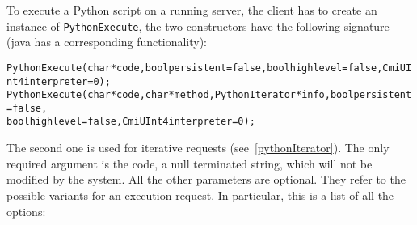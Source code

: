 To execute a Python script on a running server, the client has to create an
instance of \texttt{PythonExecute}, the two constructors have the following
signature (java has a corresponding functionality):

\begin{alltt}
PythonExecute(char *code, bool persistent=false, bool highlevel=false, CmiUInt4 interpreter=0);
PythonExecute(char *code, char *method, PythonIterator *info, bool persistent=false,
              bool highlevel=false, CmiUInt4 interpreter=0);
\end{alltt}

The second one is used for iterative requests (see~\ref{pythonIterator}). The
only required argument is the code, a null terminated string, which will not be
modified by the system. All the other parameters are optional. They refer to the
possible variants for an execution request. In particular, this is a
list of all the options:

